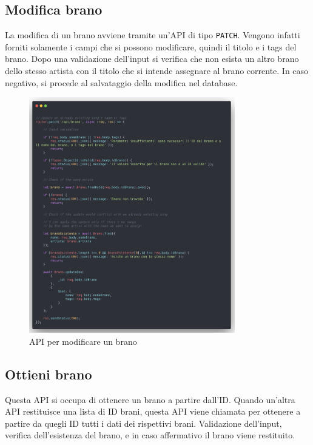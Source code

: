 \documentclass[a4paper,12pt]{article}
\begin{document}
\subsection{Modifica brano}

La modifica di un brano avviene tramite un'API di tipo \texttt{PATCH}. Vengono infatti forniti solamente i campi che si possono modificare, quindi il titolo e i tags del brano. Dopo una validazione dell'input si verifica che non esista un altro brano dello stesso artista con il titolo che si intende assegnare al brano corrente. In caso negativo, si procede al salvataggio della modifica nel database.

\begin{figure}[htp]
    \centering
    \includegraphics[width=0.8\textwidth]{source-code/api-modifica-brano.png}
    \caption{API per modificare un brano}
\end{figure}

\subsection{Ottieni brano}

Questa API si occupa di ottenere un brano a partire dall'ID. Quando un'altra API restituisce una lista di ID brani, questa API viene chiamata per ottenere a partire da quegli ID tutti i dati dei rispettivi brani. Validazione dell'input, verifica dell'esistenza del brano, e in caso affermativo il brano viene restituito.
\end{document}
